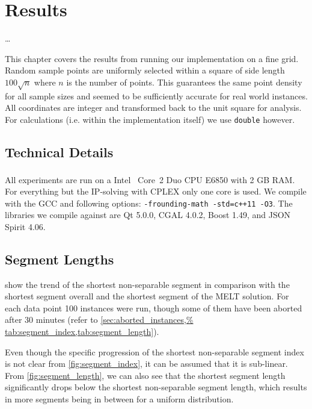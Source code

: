\chapter{Results}
\label{cha:results}

\ldots{}

This chapter covers the results from running our implementation on a
fine grid. Random sample points are uniformly selected within a
square of side length \(100 \sqrt{n}\) where \(n\) is the number of
points. This guarantees the same point density for all sample sizes
and seemed to be sufficiently accurate for real world instances.
All coordinates are integer and transformed back to the unit
square for analysis. For calculations (i.e. within the implementation
itself) we use \verb|double| however.

\section{Technical Details}
All experiments are run on a Intel\textsuperscript{\textregistered}~%
Core\texttrademark~2 Duo CPU E6850 with 2 GB RAM. For everything but
the IP-solving with CPLEX only one core is used. We compile with the
GCC and following options: \verb|-frounding-math -std=c++11 -O3|. The
libraries we compile against are Qt 5.0.0, CGAL 4.0.2, Boost 1.49,
and JSON Spirit 4.06.

\section{Segment Lengths}
\label{sec:results_segments}
 show the trend of
the shortest non-separable segment in comparison with the shortest
segment overall and the shortest segment of the \gls{MELT} solution.
For each data point 100 instances were run, though some of them have
been aborted after 30 minutes (refer to \cref{sec:aborted_instances,%
tab:segment_index,tab:segment_length}).

Even though the specific progression of the shortest non-separable
segment index is not clear from \cref{fig:segment_index}, it can be
assumed that it is sub-linear. From \cref{fig:segment_length}, we can
also see that the shortest segment length significantly drops below
the shortest non-separable segment length, which results in more
segments being in between for a uniform distribution.

